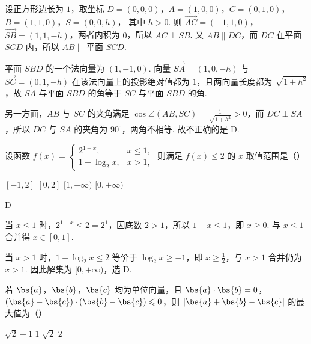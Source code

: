 \begin{solution}
设正方形边长为 \(1\)，取坐标 \(D=(0,0,0)\)，\(A=(1,0,0)\)，\(C=(0,1,0)\)，\(B=(1,1,0)\)，\(S=(0,0,h)\)，
其中 \(h>0\). 则 \(\overrightarrow{AC}=(-1,1,0)\)，\(\overrightarrow{SB}=(1,1,-h)\)，两者内积为 \(0\)，所以 \(AC\perp SB\). 又 \(AB\parallel DC\)，而 \(DC\) 在平面 \(SCD\) 内，所以 \(AB\parallel\) 平面 \(SCD\).

平面 \(SBD\) 的一个法向量为 \((1,-1,0)\). 向量 \(\overrightarrow{SA}=(1,0,-h)\) 与 \(\overrightarrow{SC}=(0,1,-h)\) 在该法向量上的投影绝对值都为 \(1\)，且两向量长度都为 \(\sqrt{1+h^{2}}\)，故 \(SA\) 与平面 \(SBD\) 的角等于 \(SC\) 与平面 \(SBD\) 的角.

另一方面，\(AB\) 与 \(SC\) 的夹角满足 \(\cos\angle(AB,SC)=\frac1{\sqrt{1+h^{2}}}>0\)，而 \(DC\perp SA\)，所以 \(DC\) 与 \(SA\) 的夹角为 \(90^\circ\)，两角不相等. 故不正确的是 D.
\end{solution}

\begin{problem}
设函数 \( f(x) = \begin{cases}
2^{1 - x}, & x \leqslant 1,\\
1 - \log_2 x, & x > 1,
\end{cases} \) 则满足 \( f(x) \leqslant 2 \) 的 \( x \) 取值范围是（\quad）

\choices
    {\([-1,2]\)}
    {\([0,2]\)}
    {\([1,+\infty)\)}
    {\([0,+\infty)\)}
\end{problem}

\begin{answer}
D
\end{answer}

\begin{solution}
当 \(x\leqslant1\) 时，\(2^{1-x}\leqslant2=2^1\)，因底数 \(2>1\)，所以 \(1-x\leqslant1\)，即 \(x\geqslant0\). 与 \(x\leqslant1\) 合并得 \(x\in[0,1]\).

当 \(x>1\) 时，\(1-\log_2x\leqslant2\) 等价于 \(\log_2x\geqslant-1\)，即 \(x\geqslant\frac12\)，与 \(x>1\) 合并仍为 \(x>1\). 因此解集为 \([0,+\infty)\)，选 D.
\end{solution}

\begin{problem}
若 \(\bs{a}\)，\(\bs{b}\)，\(\bs{c}\) 均为单位向量，且 \(\bs{a} \cdot \bs{b} = 0\)，\((\bs{a} - \bs{c}) \cdot (\bs{b} - \bs{c}) \leqslant 0\)，则 \(\lvert \bs{a} + \bs{b} - \bs{c} \rvert\) 的最大值为（\quad）

\choices
    {\(\sqrt{2} - 1\)}
    {\(1\)}
    {\(\sqrt{2}\)}
    {\(2\)}
\end{problem}

